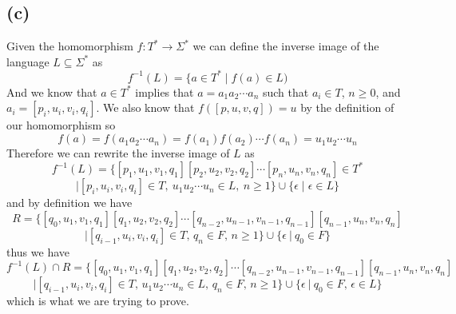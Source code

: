 \documentclass[12pt]{article}
\begin{document}
\subsection*{(c)}
Given the homomorphism $f : T^* \rightarrow \Sigma^*$ we can define the inverse
image of the language $L \subseteq \Sigma^*$ as
$$f^{-1}(L) = \{a \in T^* \mid f(a) \in L)$$
And we know that $a\in T^*$ implies that $a = a_1a_2 \cdots a_n$ such that
$a_i \in T$, $n \ge 0$, and $a_i = [p_i, u_i, v_i, q_i]$.
We also know that $f([p,u,v,q]) = u$ by the definition of our homomorphism so
$$f(a) = f(a_1a_2\cdots a_n) = f(a_1)f(a_2)\cdots f(a_n) = u_1u_2\cdots u_n$$
Therefore we can rewrite the inverse image of $L$ as
$$f^{-1}(L) =
\{[p_1,u_1,v_1,q_1][p_2,u_2,v_2,q_2]\cdots [p_n,u_n,v_n,q_n] \in T^*$$
$$\mid [p_i,u_i,v_i,q_i] \in T,\ u_1u_2\cdots u_n \in L,\ n \ge 1\} \cup
\{\epsilon \mid \epsilon \in L\}$$
and by definition we have
$$ R = \{[q_0, u_1, v_1, q_1][q_1, u_2, v_2, q_2]\cdots
[q_{n-2}, u_{n-1}, v_{n-1}, q_{n-1}][q_{n-1}, u_n, v_n, q_n]$$
$$\mid  [q_{i-1}, u_i, v_i, q_i]\in T,\, q_n\in F,\, n\geq 1\}
\cup \{\epsilon\ |\ q_0\in F\}$$
thus we have
$$f^{-1}(L)\cap R  = \{[q_0, u_1, v_1, q_1][q_1, u_2, v_2, q_2]\cdots
[q_{n-2}, u_{n-1}, v_{n-1}, q_{n-1}][q_{n-1}, u_n, v_n, q_n]$$
$$ \mid  [q_{i-1}, u_i, v_i, q_i]\in T,\, u_1u_2\cdots u_n\in L,\,
q_n\in F,\, n\geq 1\}\cup \{\epsilon\ |\ q_0\in F,\, \epsilon\in L\}$$
which is what we are trying to prove.
\end{document}
